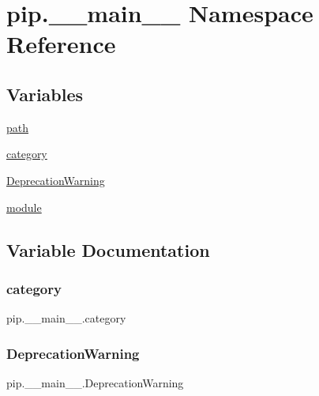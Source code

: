 \hypertarget{namespacepip_1_1____main____}{}\section{pip.\+\_\+\+\_\+main\+\_\+\+\_\+ Namespace Reference}
\label{namespacepip_1_1____main____}
\subsection*{Variables}
\begin{DoxyCompactItemize}
\item 
\hyperlink{namespacepip_1_1____main_____a6887fcc9173de15722b468b7a632e1af}{path}
\item 
\hyperlink{namespacepip_1_1____main_____ab966eee3f01317033cf3ae470437b9d7}{category}
\item 
\hyperlink{namespacepip_1_1____main_____a72f8252c60bf9b1d001ccafe369b843a}{Deprecation\+Warning}
\item 
\hyperlink{namespacepip_1_1____main_____a64d5841cb30bb0621d4770884ef2fd8d}{module}
\end{DoxyCompactItemize}


\subsection{Variable Documentation}
\mbox{\label{namespacepip_1_1____main_____ab966eee3f01317033cf3ae470437b9d7}} 
\subsubsection{\texorpdfstring{category}{category}}
{\footnotesize\ttfamily pip.\+\_\+\+\_\+main\+\_\+\+\_\+.\+category}

\mbox{\label{namespacepip_1_1____main_____a72f8252c60bf9b1d001ccafe369b843a}} 
\subsubsection{\texorpdfstring{Deprecation\+Warning}{DeprecationWarning}}
{\footnotesize\ttfamily pip.\+\_\+\+\_\+main\+\_\+\+\_\+.\+Deprecation\+Warning}

